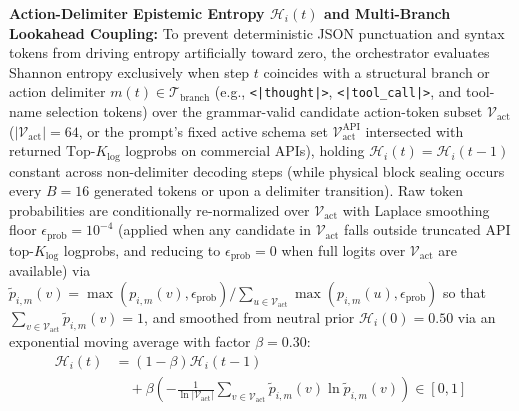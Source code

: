 \documentclass[conference,10pt]{IEEEtran}
\begin{document}
\textbf{Action-Delimiter Epistemic Entropy $\mathcal{H}_i(t)$ and Multi-Branch Lookahead Coupling:} To prevent deterministic JSON punctuation and syntax tokens from driving entropy artificially toward zero, the orchestrator evaluates Shannon entropy exclusively when step $t$ coincides with a structural branch or action delimiter $m(t) \in \mathcal{T}_{\text{branch}}$ (e.g., \texttt{<|thought|>}, \texttt{<|tool\_call|>}, and tool-name selection tokens) over the grammar-valid candidate action-token subset $\mathcal{V}_{\text{act}}$ ($|\mathcal{V}_{\text{act}}| = 64$, or the prompt's fixed active schema set $\mathcal{V}_{\text{act}}^{\text{API}}$ intersected with returned $\text{Top-}K_{\text{log}}$ logprobs on commercial APIs), holding $\mathcal{H}_i(t) = \mathcal{H}_i(t-1)$ constant across non-delimiter decoding steps (while physical block sealing occurs every $B=16$ generated tokens or upon a delimiter transition). Raw token probabilities are conditionally re-normalized over $\mathcal{V}_{\text{act}}$ with Laplace smoothing floor $\epsilon_{\text{prob}} = 10^{-4}$ (applied when any candidate in $\mathcal{V}_{\text{act}}$ falls outside truncated API top-$K_{\text{log}}$ logprobs, and reducing to $\epsilon_{\text{prob}}=0$ when full logits over $\mathcal{V}_{\text{act}}$ are available) via $\tilde{p}_{i,m}(v) = \max(p_{i,m}(v), \epsilon_{\text{prob}}) / \sum_{u \in \mathcal{V}_{\text{act}}} \max(p_{i,m}(u), \epsilon_{\text{prob}})$ so that $\sum_{v \in \mathcal{V}_{\text{act}}} \tilde{p}_{i,m}(v) = 1$, and smoothed from neutral prior $\mathcal{H}_i(0) = 0.50$ via an exponential moving average with factor $\beta = 0.30$:
\begin{equation}
\label{eq:branch_entropy}
\begin{aligned}
\mathcal{H}_i(t) &= (1 - \beta)\mathcal{H}_i(t-1) \\
&\quad + \beta\!\left(-\frac{1}{\ln |\mathcal{V}_{\text{act}}|} \sum_{v \in \mathcal{V}_{\text{act}}} \tilde{p}_{i,m}(v)\ln \tilde{p}_{i,m}(v)\right) \in [0, 1]
\end{aligned}
\end{equation}
\end{document}
